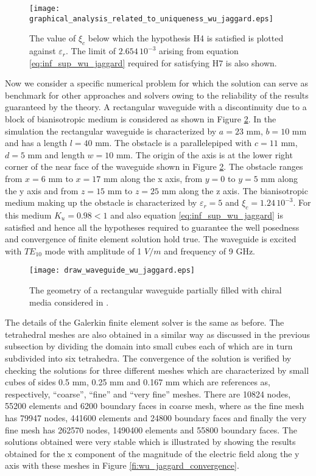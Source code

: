 \begin{figure}
\texttt{[image: graphical\_analysis\_related\_to\_uniqueness\_wu\_jaggard.eps]}
\caption{The value of $\xi_c$ below which the hypothesis H4
is satisfied is plotted against $\varepsilon_r$.
The limit of $2.654 \, 10^{-3}$ arising from equation \eqref{eq:inf_sup_wu_jaggard}
required for satisfying H7 is also shown.}
\label{fi:critical_value_of_xi_for_uniqueness_wu_jaggard}
\end{figure}

Now we consider a specific numerical problem for which the solution can serve as benchmark 
for other approaches and solvers owing to the reliability of the results guaranteed by the theory.
A rectangular waveguide with a discontinuity due to a block of bianisotropic medium is considered 
as shown in Figure \ref{fi:geometry_wujaggard}.
In the simulation the rectangular waveguide is characterized by  $a=23$ mm, $b=10$ mm  and has a length $l=40$ mm.
The obstacle is a parallelepiped with  $c=11$ mm, $d=5$ mm and length $w=10$ mm.
The origin of the axis is at the lower right corner of the near face of the waveguide shown in Figure \ref{fi:geometry_wujaggard}.
The obstacle ranges from $x = 6$ mm to $x=17$ mm along the x axis, 
from $y=0$ to $y=5$ mm along the y axis and from $z=15$ mm to $z=25$ mm along the z axis.
The bianisotropic medium making up the obstacle is characterized by $\varepsilon_r = 5$ 
and $\xi_c = 1.24\, 10^{-3}$.
For this medium $K_u=0.98 < 1 $ and also equation \eqref{eq:inf_sup_wu_jaggard} is satisfied
and hence all the hypotheses required to guarantee the well posedness and convergence of finite element
solution hold true.
The waveguide is excited with $TE_{10}$ mode with amplitude of 1 $V/m$ and frequency of 9 GHz.

\begin{figure}
\texttt{[image: draw\_waveguide\_wu\_jaggard.eps]}
\caption{The geometry of a rectangular waveguide partially filled with chiral media considered in \cite{wujaggard}.}
\label{fi:geometry_wujaggard}
\end{figure}

The details of the Galerkin finite element solver is the same as before.
The tetrahedral meshes are also obtained in a similar way as discussed in the previous subsection
by dividing the domain into small cubes each of which are in turn subdivided into six tetrahedra.
The convergence of the solution is verified by checking the solutions for three different meshes
which are characterized by small cubes of sides 0.5 mm, 0.25 mm and 0.167 mm which are references as,
respectively, ``coarse'', ``fine'' and ``very fine'' meshes.
There are 10824 nodes, 55200 elements and 6200 boundary faces in coarse mesh,
where as the fine mesh has 79947 nodes, 441600 elements and 24800 boundary faces and 
finally the very fine mesh has 262570 nodes, 1490400 elements and 55800 boundary faces.
The solutions obtained were very stable which is illustrated by showing the results obtained 
for the x component of the magnitude of the electric field along the y axis with
these meshes in Figure \ref{fi:wu_jaggard_convergence}.

